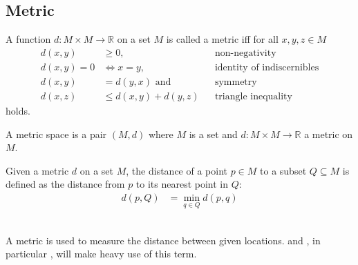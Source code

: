 \subsection{Metric}
	\begin{mydef}\label{metric}
		A function $d: M \times M \to \mathbb{R}$ on a set $M$ is called a \textnormal{metric} iff for all $x, y, z \in M$
		\begin{align*}
			d(x, y)	&\ge 0,			&&\text{non-negativity}\\
			d(x, y) = 0	&\Leftrightarrow x = y,	&&\text{identity of indiscernibles}\\
			d(x, y)	&= d(y, x) \text{ and }	&&\text{symmetry}\\
			d(x, z)	&\le d(x, y) + d(y, z)	&&\text{triangle inequality}
		\end{align*}
		holds.
	\end{mydef}
	\begin{mydef}\label{metricSpace}
		A \textnormal{metric space} is a pair $(M, d)$ where $M$ is a set
		and $d: M \times M \to \mathbb{R}$ a metric on $M$.
	\end{mydef}
	\begin{mydef}\label{metricSet}
		Given a metric $d$ on a set $M$, the distance of a point $p \in M$ to a subset $Q \subseteq M$
		is defined as the distance from $p$ to its nearest point in $Q$:
		\begin{align*}
			d(p, Q)	&= \min_{q \in Q} d(p, q)
		\end{align*}
	\end{mydef}\quad\\
	A metric is used to measure the distance between given locations. 
	and , in particular , will make heavy use of this term.
	
